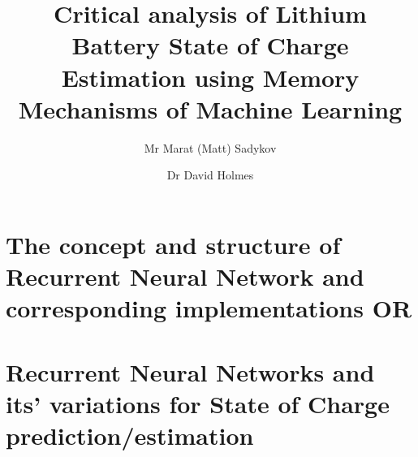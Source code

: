 \documentclass[fleqn,10pt]{olplainarticle}
\title{Critical analysis of Lithium Battery State of Charge Estimation using Memory Mechanisms of Machine Learning}
\author[1]{Mr Marat (Matt) Sadykov}
\author[2]{Dr David Holmes}
\affil[1]{Queensland University of Technology}
\begin{document}
\flushbottom
\maketitle
\thispagestyle{empty}

\section{The concept and structure of Recurrent Neural Network and corresponding implementations OR}
\section{Recurrent Neural Networks and its' variations for State of Charge prediction/estimation}















    
    
    
\end{document}
